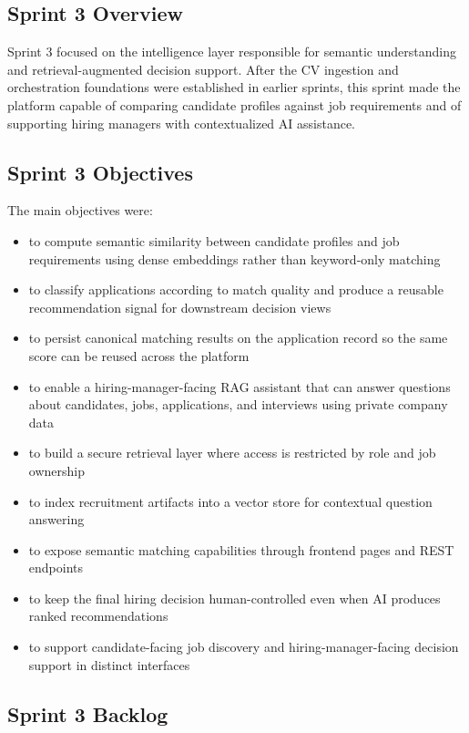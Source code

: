 \subsection{Sprint 3 Overview}

Sprint 3 focused on the intelligence layer responsible for semantic understanding and retrieval-augmented decision support. After the CV ingestion and orchestration foundations were established in earlier sprints, this sprint made the platform capable of comparing candidate profiles against job requirements and of supporting hiring managers with contextualized AI assistance.

\subsection{Sprint 3 Objectives}
\label{sec:sprint3:objectives}

The main objectives were:
\begin{itemize}
    \item to compute semantic similarity between candidate profiles and job requirements using dense embeddings rather than keyword-only matching
    \item to classify applications according to match quality and produce a reusable recommendation signal for downstream decision views
    \item to persist canonical matching results on the application record so the same score can be reused across the platform
    \item to enable a hiring-manager-facing RAG assistant that can answer questions about candidates, jobs, applications, and interviews using private company data
    \item to build a secure retrieval layer where access is restricted by role and job ownership
    \item to index recruitment artifacts into a vector store for contextual question answering
    \item to expose semantic matching capabilities through frontend pages and REST endpoints
    \item to keep the final hiring decision human-controlled even when AI produces ranked recommendations
    \item to support candidate-facing job discovery and hiring-manager-facing decision support in distinct interfaces
\end{itemize}

\subsection{Sprint 3 Backlog}
\label{sec:sprint3:backlog}

